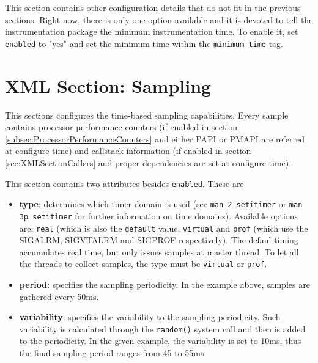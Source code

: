 

This section contains other configuration details that do not fit in the previous sections. Right now, there is only one option available and it is devoted to tell the instrumentation package the minimum instrumentation time. To enable it, set {\tt enabled} to "yes" and set the minimum time within the {\tt minimum-time} tag.

\section{XML Section: Sampling}\label{sec:XMLSectionSampling}



This sections configures the time-based sampling capabilities. Every sample contains processor performance counters (if enabled in section \ref{subsec:ProcessorPerformanceCounters} and either PAPI or PMAPI are referred at configure time) and callstack information (if enabled in section \ref{sec:XMLSectionCallers} and proper dependencies are set at configure time).

This section contains two attributes besides {\tt enabled}. These are
\begin{itemize}
 \item {\bf type}: determines which timer domain is used (see {\tt man 2 setitimer} or {\tt man 3p setitimer} for further information on time domains). Available options are: {\tt real} (which is also the {\tt default} value, {\tt virtual} and {\tt prof} (which use the SIGALRM, SIGVTALRM and SIGPROF respectively). The defaul timing accumulates real time, but only issues samples at master thread. To let all the threads to collect samples, the type must be {\tt virtual} or {\tt prof}.
 \item {\bf period}: specifies the sampling periodicity. In the example above, samples are gathered every 50ms.
 \item {\bf variability}: specifies the variability to the sampling periodicity. Such variability is calculated through the {\tt random()} system call and then is added to the periodicity. In the given example, the variability is set to 10ms, thus the final sampling period ranges from 45 to 55ms.
\end{itemize}


